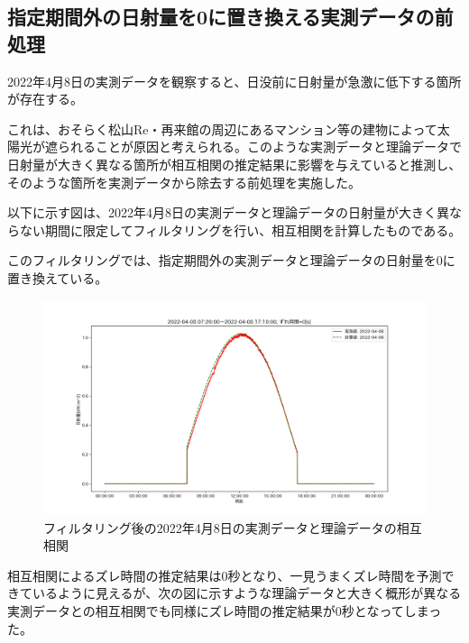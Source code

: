 \documentclass[a4j,12pt,]{jarticle}
\begin{document}
\subsection{指定期間外の日射量を0に置き換える実測データの前処理}
2022年4月8日の実測データを観察すると、日没前に日射量が急激に低下する箇所が存在する。

これは、おそらく松山Re・再来館の周辺にあるマンション等の建物によって太陽光が遮られることが原因と考えられる。このような実測データと理論データで日射量が大きく異なる箇所が相互相関の推定結果に影響を与えていると推測し、そのような箇所を実測データから除去する前処理を実施した。

以下に示す図は、2022年4月8日の実測データと理論データの日射量が大きく異ならない期間に限定してフィルタリングを行い、相互相関を計算したものである。

このフィルタリングでは、指定期間外の実測データと理論データの日射量を0に置き換えている。

\begin{figure}[H]
  \begin{center}
    \includegraphics[width=160mm]{6.png}
    \caption{フィルタリング後の2022年4月8日の実測データと理論データの相互相関}
    \label{p6}
  \end{center}
\end{figure}

相互相関によるズレ時間の推定結果は0秒となり、一見うまくズレ時間を予測できているように見えるが、次の図に示すような理論データと大きく概形が異なる実測データとの相互相関でも同様にズレ時間の推定結果が0秒となってしまった。
\end{document}
